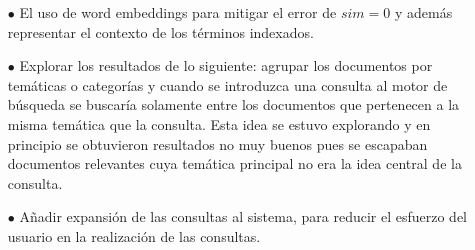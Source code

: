 \begin{enumerate}
    \item[$\bullet$] El uso de word embeddings para mitigar el error de $sim = 0$ y además representar el contexto de los términos indexados.
    \item[$\bullet$] Explorar los resultados de lo siguiente: agrupar los documentos por temáticas o categorías y cuando se introduzca una consulta al motor de búsqueda se buscaría solamente entre los documentos que pertenecen a la misma temática que la consulta. Esta idea se estuvo explorando y en principio se obtuvieron resultados no muy buenos pues se escapaban documentos relevantes cuya temática principal no era la idea central de la consulta. 
    \item[$\bullet$] Añadir expansión de las consultas al sistema, para reducir el esfuerzo del usuario en la realización de las consultas.
\end{enumerate}